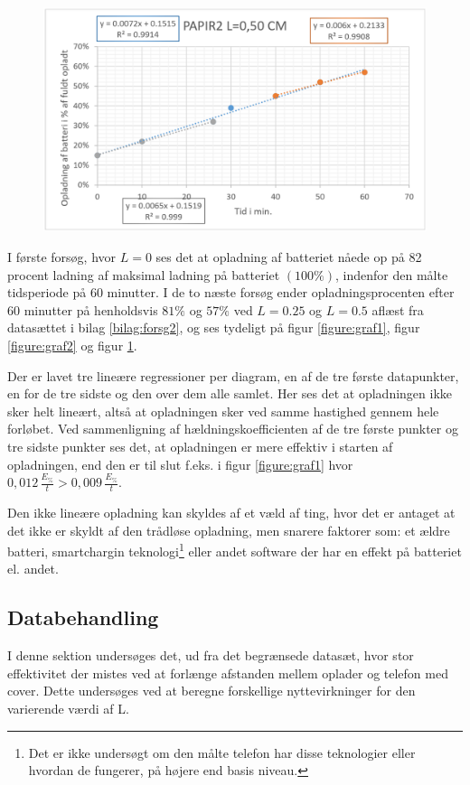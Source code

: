 \begin{figure}[H]
\centering
\includegraphics[width=1\textwidth]{Setup/forsg2_graf3}
\caption{}
\label{figure:graf3}
\end{figure}

I første forsøg, hvor $L = 0$ ses det at opladning af batteriet nåede op på 82 procent ladning af maksimal ladning på batteriet $(100\%)$, indenfor den målte tidsperiode på 60 minutter. I de to næste forsøg ender opladningsprocenten efter 60 minutter på henholdsvis $81\%$ og $57\%$ ved $L = 0.25$ og $L = 0.5$ aflæst fra datasættet i bilag \ref{bilag:forsg2}, og ses tydeligt på figur \ref{figure:graf1}, figur \ref{figure:graf2} og figur \ref{figure:graf3}.

Der er lavet tre lineære regressioner per diagram, en af de tre første datapunkter, en for de tre sidste og den over dem alle samlet. Her ses det at opladningen ikke sker helt lineært, altså at opladningen sker ved samme hastighed gennem hele forløbet. Ved sammenligning af hældningskoefficienten af de tre første punkter og tre sidste punkter ses det, at opladningen er mere effektiv i starten af opladningen, end den er til slut f.eks. i figur \ref{figure:graf1} hvor $0,012\, \frac{E_\%}{t} > 0,009\, \frac{E_\%}{t}$.

Den ikke lineære opladning kan skyldes af et væld af ting, hvor det er antaget at det ikke er skyldt af den trådløse opladning, men snarere faktorer som: et ældre batteri, smartchargin teknologi\footnote{Det er ikke undersøgt om den målte telefon har disse teknologier eller hvordan de fungerer, på højere end basis niveau.} eller andet software der har en effekt på batteriet el. andet. 

\subsection{Databehandling}
I denne sektion undersøges det, ud fra det begrænsede datasæt, hvor stor effektivitet der mistes ved at forlænge afstanden mellem oplader og telefon med cover. Dette undersøges ved at beregne forskellige nyttevirkninger for den varierende værdi af L. 

